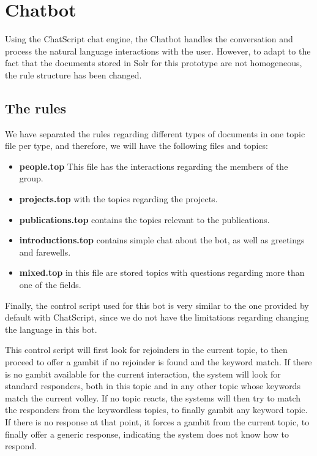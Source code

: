 \section{Chatbot}
\label{sec:chatbotgsi}

Using the ChatScript chat engine, the Chatbot handles the conversation and process the natural language interactions with the user. However, to adapt to the fact that the documents stored in Solr for this prototype are not homogeneous, the rule structure has been changed.

\subsection{The rules}

We have separated the rules regarding different types of documents in one topic file per type, and therefore, we will have the following files and topics:

\begin{itemize}
 \item \textbf{people.top} This file has the interactions regarding the members of the group.
 \item \textbf{projects.top} with the topics regarding the projects.
 \item \textbf{publications.top} contains the topics relevant to the publications.
 \item \textbf{introductions.top} contains simple chat about the bot, as well as greetings and farewells.
 \item \textbf{mixed.top} in this file are stored topics with questions regarding more than one of the fields.
\end{itemize}

Finally, the control script used for this bot is very similar to the one provided by default with ChatScript, since we do not have the limitations regarding changing the language in this bot.

This control script will first look for rejoinders in the current topic, to then proceed to offer a gambit if no rejoinder is found and the keyword match. If there is no gambit available for the current interaction, the system will look for standard responders, both in this topic and in any other topic whose keywords match the current volley. If no topic reacts, the systems will then try to match the responders from the keywordless topics, to finally gambit any keyword topic. If there is no response at that point, it forces a gambit from the current topic, to finally offer a generic response, indicating the system does not know how to respond.



